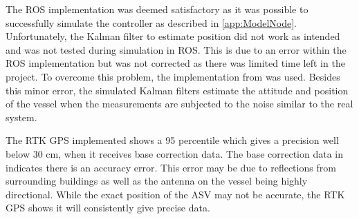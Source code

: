 The ROS implementation was deemed satisfactory as it was possible to successfully simulate the controller as described in \autoref{app:ModelNode}. Unfortunately, the Kalman filter to estimate position did not work as intended and was not tested during simulation in ROS. This is due to an error within the ROS implementation but was not corrected as there was limited time left in the project. To overcome this problem, the implementation from \cite{thesis} was used. Besides this minor error, the simulated Kalman filters estimate the attitude and position of the vessel when the measurements are subjected to the noise similar to the real system.

The RTK GPS implemented shows a 95 percentile which gives a precision well below 30 cm, when it receives base correction data. The base correction data in  indicates there is an accuracy error. This error may be due to reflections from surrounding buildings as well as the antenna on the vessel being highly directional. While the exact position of the ASV may not be accurate, the RTK GPS shows it will consistently give precise data.

